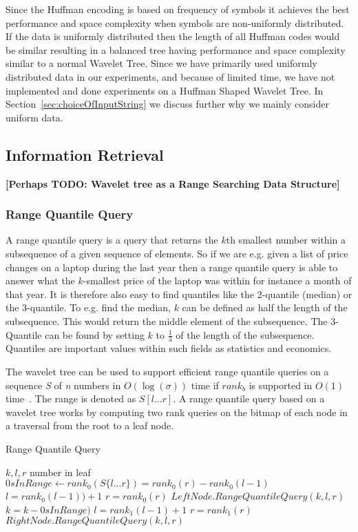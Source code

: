 Since the Huffman encoding is based on frequency of symbols it achieves the best performance and space complexity when symbols are non-uniformly distributed.
If the data is uniformly distributed then the length of all Huffman codes would be similar resulting in a balanced tree having performance and space complexity similar to a normal Wavelet Tree.
Since we have primarily used uniformly distributed data in our experiments, and because of limited time, we have not implemented and done experiments on a Huffman Shaped Wavelet Tree.
In Section~\ref{sec:choiceOfInputString} we discuss further why we mainly consider uniform data.


\subsection{Information Retrieval}
\textbf{[Perhaps TODO: Wavelet tree as a Range Searching Data Structure]}


\subsubsection{Range Quantile Query}
A range quantile query is a query that returns the $k$th smallest number within a subsequence of a given sequence of elements.
So if we are e.g. given a list of price changes on a laptop during the last year then a range quantile query is able to answer what the $k$-smallest price of the laptop was within for instance a month of that year.
It is therefore also easy to find quantiles like the 2-quantile (median) or the 3-quantile.
To e.g. find the median, $k$ can be defined as half the length of the subsequence.
This would return the middle element of the subsequence.
The 3-Quantile can be found by setting $k$ to $\frac{1}{3}$ of the length of the subsequence. 
Quantiles are important values within such fields as statistics and economics.

The wavelet tree can be used to support efficient range quantile queries on a sequence \textit{S} of \textit{n} numbers in $O(\log(\sigma))$ time if $rank_b$ is supported in $O(1)$ time~\citep[Section 3]{RangeQuantileQueryWT}. 
The range is denoted as $S[l ... r]$.
A range quantile query based on a wavelet tree works by computing two rank queries on the bitmap of each node in a traversal from the root to a leaf node. 

\begin{algorithm}
\caption{Range Quantile Query}
\label{alg:RangeQuantileQuery}
\begin{algorithmic}
 {$k,l,r$}
	\State \Return number in leaf
\EndIf
\State $\textit{0}sInRange \gets rank_0(S \lbrace l...r \rbrace) = rank_0(r) - rank_0(l-1)$
	\State $l = rank_0(l-1))+1$
	\State $r = rank_0(r)$
	\State \Return $LeftNode.RangeQuantileQuery(k,l,r)$
\Else
	\State $k = k - \textit{0}sInRange)$
	\State $l = rank_1(l-1)+1$
	\State $r = rank_1(r)$
	\State \Return $RightNode.RangeQuantileQuery(k,l,r)$
\EndIf

\EndFunction
\end{algorithmic}
\end{algorithm}

